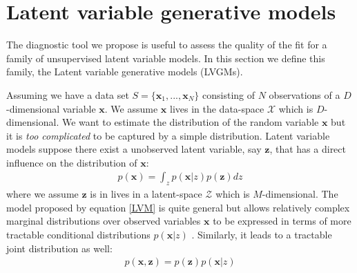 \documentclass{article}
\newcommand{\x}{\mathbf{x}}
\newcommand{\z}{\mathbf{z}}
\begin{document}
\section{Latent variable generative models}\label{lvgm}

The diagnostic tool we propose is useful to assess the quality of the fit for a family of unsupervised latent variable models. In this section we define this family, the Latent variable generative models (LVGMs).

\bigskip

Assuming we have a data set $S= \{\mathbf{x}_1,...,\mathbf{x}_N\}$ consisting of $N$ observations of a $D$-dimensional variable $\mathbf{x}$. We assume $\x$ lives in the data-space $\mathcal{X}$ which is $D$-dimensional. We want to estimate the distribution of the random variable $\mathbf{x}$ but it is \textit{too complicated} to be captured by a simple distribution. Latent variable models suppose there exist a unobserved latent variable, say $\mathbf{z}$, that has a direct influence on the distribution of $\mathbf{x}$:
\begin{align}
p(\x) = \int_{z} p(\x|z)p(\z) dz
\label{LVM}
\end{align}
where we assume $\z$ is in lives in a latent-space $\mathcal{Z}$ which is $M$-dimensional. The model proposed by equation \ref{LVM} is quite general but allows relatively complex marginal distributions over observed variables $\mathbf{x}$ to be expressed in terms of more tractable conditional distributions $p(\x|z)$ \cite{Bishop07}. Similarly, it leads to a tractable joint distribution as well:
\begin{align}
p(\x,\z) = p(\z)p(\x|z)
\label{jointLVM}
\end{align}
\end{document}
